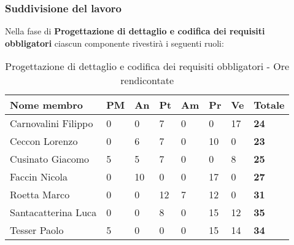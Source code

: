 		\subsubsection{Suddivisione del lavoro} %
		\label{ssub:suddivisione_del_lavoro}
		Nella fase di \textbf{Progettazione di dettaglio e codifica dei requisiti obbligatori} ciascun componente rivestirà i seguenti ruoli: \\
			\begin{table}[!h]
				\begin{center}
					\begin{tabularx}{0.9\textwidth}{|l|l|l|l|l|l|l|X|}
						\hline
						\textbf{Nome membro} & \textbf{PM} & \textbf{An} & \textbf{Pt} & \textbf{Am} & \textbf{Pr} & \textbf{Ve} & \textbf{Totale} \\
						\hline
						Carnovalini Filippo & 0 & 0 & 7 & 0 & 0 & 17 & \textbf{24} \\
						\hline
						Ceccon Lorenzo & 0 & 6 & 7 & 0 & 10 & 0 & \textbf{23} \\
						\hline
						Cusinato Giacomo & 5 & 5 & 7 & 0 & 0 & 8 & \textbf{25} \\
						\hline
						Faccin Nicola & 0 & 10 & 0 & 0 & 17 & 0 & \textbf{27} \\
						\hline
						Roetta Marco & 0 & 0 & 12 & 7 & 12 & 0 & \textbf{31} \\
						\hline
						Santacatterina Luca & 0 & 0 & 8 & 0 & 15 & 12 & \textbf{35} \\
						\hline
						Tesser Paolo & 5 & 0 & 0 & 0 & 15 & 14 & \textbf{34} \\
						\hline
					\end{tabularx}
				\end{center}
			\caption{Progettazione di dettaglio e codifica dei requisiti obbligatori - Ore rendicontate}
			\end{table}
		
